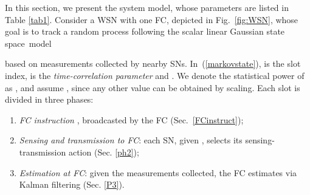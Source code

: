 \documentclass[10pt,twocolumn,twoside]{IEEEtran}
\theoremstyle{plain}
\begin{document}
\noindent In this section, we present the system model, whose parameters are listed in Table \ref{tab1}.
 Consider a WSN with one FC, depicted in Fig.~\ref{fig:WSN}, whose goal
 is to track a random process 
 following the  scalar linear Gaussian state space~model
  
 based on measurements collected  by  nearby SNs.
In~(\ref{markovstate}),  is the slot index,
  is the \emph{time-correlation parameter}  and .
 We denote the statistical power of  as ,
 and assume  , since any other value can be obtained by scaling.
  Each slot is divided in three phases:
 \begin{enumerate}
 \item \emph{FC instruction} , broadcasted by the FC (Sec.~\ref{FCinstruct});
 \item \emph{Sensing and transmission to FC}: each SN, given , selects its
 sensing-transmission action (Sec. \ref{ph2});
 \item \emph{Estimation at FC}: given the measurements collected, the FC estimates  via Kalman filtering (Sec. \ref{P3}).
 \end{enumerate}
 
\end{document}
